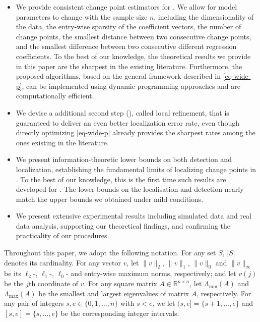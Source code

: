 \documentclass[twoside]{article}
\begin{document}
\begin{itemize}
\item We provide consistent change point estimators for .  We allow for model parameters to change with the sample size $n$, including the dimensionality of the data, the entry-wise sparsity of the coefficient vectors, the number of change points, the smallest distance between two consecutive change points, and the smallest difference between two consecutive different regression coefficients.   To the best of our knowledge, the theoretical results we provide in this paper are the sharpest in the existing literature.  Furthermore, the proposed algorithms, based on the general framework described  in \eqref{eq-wide-p}, can be implemented using dynamic programming approaches and are computationally efficient.
\item We devise a additional second step (), called local refinement, that is guaranteed to deliver an even better localization error rate, even though directly optimizing \eqref{eq-wide-p} already provides the sharpest rates among the ones existing in the literature.
\item We present information-theoretic lower bounds on both detection and localization, establishing the fundamental limits of localizing change points in .  To the best of our knowledge, this is the first time such results are developed for .  The lower bounds on the localisation and detection nearly match the upper bounds we obtained under mild conditions.  
\item We present extensive experimental results including simulated data and real data analysis, supporting our theoretical findings, and confirming the practicality of our procedures.
\end{itemize}


Throughout this paper, we adopt the following notation.  For any set $S$, $|S|$ denotes its cardinality.  For any vector $v$, let $\|v\|_2$, $\|v\|_1$, $\|v\|_0$ and $\|v\|_{\infty}$ be its $\ell_2$-, $\ell_1$-, $\ell_0$- and entry-wise maximum norms, respectively; and let $v(j)$ be the $j$th coordinate of $v$.  For any square matrix $A \in \mathbb{R}^{n \times n}$, let $\Lambda_{\min}(A)$ and $ \Lambda_{\max}(A)$ be the smallest and largest eigenvalues of matrix $A$, respectively.    For any pair of integers $s, e \in \{0, 1, \ldots, n\}$ with $s < e$, we let $(s, e] = \{s + 1, \ldots, e\}$ and $[s, e] = \{s , \ldots, e\}$ be the corresponding integer intervals.
\end{document}
